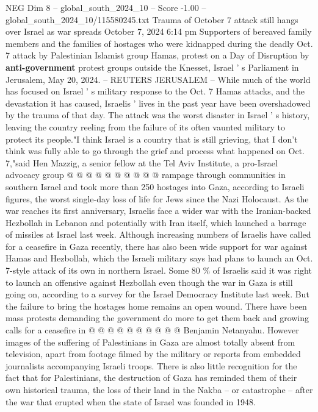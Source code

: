 \begin{textsample}{NEG Dim 8 – global\_south\_2024\_10 – Score -1.00 – global\_south\_2024\_10/115580245.txt}  \label{ex:f8_neg_144}
Trauma of October 7 attack still hangs over Israel as war spreads October 7, 2024 6:14 pm Supporters of bereaved family members and the families of hostages who were kidnapped during the deadly Oct. 7 attack by Palestinian Islamist group Hamas, protest on a Day of Disruption by \textbf{anti-government} protest groups outside the Knesset, Israel ' s Parliament in Jerusalem, May 20, 2024. -- REUTERS JERUSALEM -- While much of the world has focused on Israel ' s military response to the Oct. 7 Hamas attacks, and the devastation it has caused, Israelis ' lives in the past year have been overshadowed by the trauma of that day.
The attack was the worst disaster in Israel ' s history, leaving the country reeling from the failure of its often vaunted military to protect its people."I think Israel is a country that is still grieving, that I don't think was fully able to go through the grief and process what happened on Oct. 7,"said Hen Mazzig, a senior fellow at the Tel Aviv Institute, a pro-Israel advocacy group @ @ @ @ @ @ @ @ @ @ rampage through communities in southern Israel and took more than 250 hostages into Gaza, according to Israeli figures, the worst single-day loss of life for Jews since the Nazi Holocaust.
As the war reaches its first anniversary, Israelis face a wider war with the Iranian-backed Hezbollah in Lebanon and potentially with Iran itself, which launched a barrage of missiles at Israel last week.
Although increasing numbers of Israelis have called for a ceasefire in Gaza recently, there has also been wide support for war against Hamas and Hezbollah, which the Israeli military says had plans to launch an Oct. 7-style attack of its own in northern Israel.
Some 80 \% of Israelis said it was right to launch an offensive against Hezbollah even though the war in Gaza is still going on, according to a survey for the Israel Democracy Institute last week.
But the failure to bring the hostages home remains an open wound.
There have been mass protests demanding the government do more to get them back and growing calls for a ceasefire in @ @ @ @ @ @ @ @ @ @ Benjamin Netanyahu.
However images of the suffering of Palestinians in Gaza are almost totally absent from television, apart from footage filmed by the military or reports from embedded journalists accompanying Israeli troops.
There is also little recognition for the fact that for Palestinians, the destruction of Gaza has reminded them of their own historical trauma, the loss of their land in the Nakba -- or catastrophe -- after the war that erupted when the state of Israel was founded in 1948.

\end{textsample}
